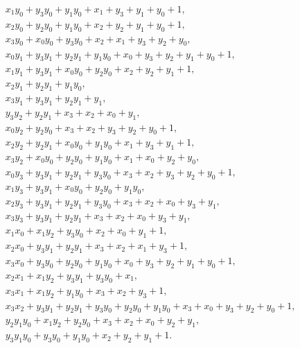 \begin{align*}
& x_{1}y_{0} + y_{3}y_{0} + y_{1}y_{0} + x_{1} + y_{3} + y_{1} + y_{0} + 1,\\
& x_{2}y_{0} + y_{2}y_{0} + y_{1}y_{0} + x_{2} + y_{2} + y_{1} + y_{0} + 1,\\
& x_{3}y_{0} + x_{0}y_{0} + y_{3}y_{0} + x_{2} + x_{1} + y_{3} + y_{2} + y_{0},\\
& x_{0}y_{1} + y_{3}y_{1} + y_{2}y_{1} + y_{1}y_{0} + x_{0} + y_{3} + y_{2} + y_{1} + y_{0} + 1,\\
& x_{1}y_{1} + y_{3}y_{1} + x_{0}y_{0} + y_{2}y_{0} + x_{2} + y_{2} + y_{1} + 1,\\
& x_{2}y_{1} + y_{2}y_{1} + y_{1}y_{0},\\
& x_{3}y_{1} + y_{3}y_{1} + y_{2}y_{1} + y_{1},\\
& y_{3}y_{2} + y_{2}y_{1} + x_{3} + x_{2} + x_{0} + y_{1},\\
& x_{0}y_{2} + y_{2}y_{0} + x_{3} + x_{2} + y_{3} + y_{2} + y_{0} + 1,\\
& x_{2}y_{2} + y_{2}y_{1} + x_{0}y_{0} + y_{1}y_{0} + x_{1} + y_{3} + y_{1} + 1,\\
& x_{3}y_{2} + x_{0}y_{0} + y_{2}y_{0} + y_{1}y_{0} + x_{1} + x_{0} + y_{2} + y_{0},\\
& x_{0}y_{3} + y_{3}y_{1} + y_{2}y_{1} + y_{3}y_{0} + x_{3} + x_{2} + y_{3} + y_{2} + y_{0} + 1,\\
& x_{1}y_{3} + y_{3}y_{1} + x_{0}y_{0} + y_{2}y_{0} + y_{1}y_{0},\\
& x_{2}y_{3} + y_{3}y_{1} + y_{2}y_{1} + y_{3}y_{0} + x_{3} + x_{2} + x_{0} + y_{3} + y_{1},\\
& x_{3}y_{3} + y_{3}y_{1} + y_{2}y_{1} + x_{3} + x_{2} + x_{0} + y_{3} + y_{1},\\
& x_{1}x_{0} + x_{1}y_{2} + y_{3}y_{0} + x_{2} + x_{0} + y_{1} + 1,\\
& x_{2}x_{0} + y_{3}y_{1} + y_{2}y_{1} + x_{3} + x_{2} + x_{1} + y_{3} + 1,\\
& x_{3}x_{0} + y_{3}y_{0} + y_{2}y_{0} + y_{1}y_{0} + x_{0} + y_{3} + y_{2} + y_{1} + y_{0} + 1,\\
& x_{2}x_{1} + x_{1}y_{2} + y_{3}y_{1} + y_{3}y_{0} + x_{1},\\
& x_{3}x_{1} + x_{1}y_{2} + y_{1}y_{0} + x_{3} + x_{2} + y_{3} + 1,\\
& x_{3}x_{2} + y_{3}y_{1} + y_{2}y_{1} + y_{3}y_{0} + y_{2}y_{0} + y_{1}y_{0} + x_{3} + x_{0} + y_{3} + y_{2} + y_{0} + 1,\\
& y_{2}y_{1}y_{0} + x_{1}y_{2} + y_{2}y_{0} + x_{3} + x_{2} + x_{0} + y_{2} + y_{1},\\
& y_{3}y_{1}y_{0} + y_{3}y_{0} + y_{1}y_{0} + x_{2} + y_{2} + y_{1} + 1.\\
\end{align*}

